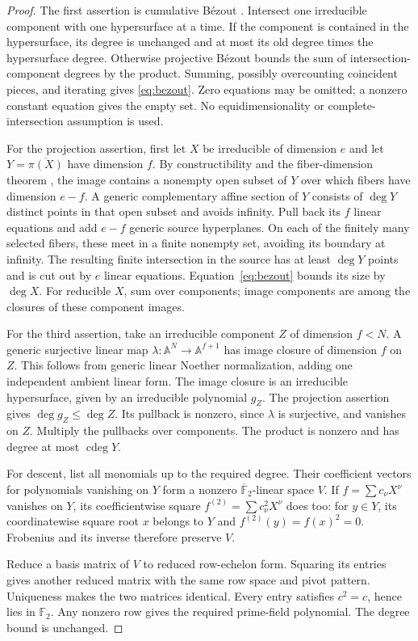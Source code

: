 \documentclass[11pt,a4paper]{article}
\newcommand{\F}{\mathbb F}
\newcommand{\A}{\mathbb A}
\DeclareMathOperator{\cdeg}{cdeg}
\theoremstyle{definition}
\theoremstyle{remark}
\numberwithin{equation}{section}
\begin{document}
\begin{proof}
The first assertion is cumulative B\'ezout \cite[Theorem 1.1]{LR}. Intersect one irreducible component with one hypersurface at a time. If the component is contained in the hypersurface, its degree is unchanged and at most its old degree times the hypersurface degree. Otherwise projective B\'ezout bounds the sum of intersection-component degrees by the product. Summing, possibly overcounting coincident pieces, and iterating gives \eqref{eq:bezout}. Zero equations may be omitted; a nonzero constant equation gives the empty set. No equidimensionality or complete-intersection assumption is used.

For the projection assertion, first let $X$ be irreducible of dimension $e$ and let $Y=\overline{\pi(X)}$ have dimension $f$. By constructibility and the fiber-dimension theorem \cite[Chapter I]{Hartshorne}, the image contains a nonempty open subset of $Y$ over which fibers have dimension $e-f$. A generic complementary affine section of $Y$ consists of $\deg Y$ distinct points in that open subset and avoids infinity. Pull back its $f$ linear equations and add $e-f$ generic source hyperplanes. On each of the finitely many selected fibers, these meet in a finite nonempty set, avoiding its boundary at infinity. The resulting finite intersection in the source has at least $\deg Y$ points and is cut out by $e$ linear equations. Equation~\eqref{eq:bezout} bounds its size by $\deg X$. For reducible $X$, sum over components; image components are among the closures of these component images.

For the third assertion, take an irreducible component $Z$ of dimension $f<N$. A generic surjective linear map $\lambda:\A^N\to\A^{f+1}$ has image closure of dimension $f$ on $Z$. This follows from generic linear Noether normalization, adding one independent ambient linear form. The image closure is an irreducible hypersurface, given by an irreducible polynomial $g_Z$. The projection assertion gives $\deg g_Z\le\deg Z$. Its pullback is nonzero, since $\lambda$ is surjective, and vanishes on $Z$. Multiply the pullbacks over components. The product is nonzero and has degree at most $\cdeg Y$.

For descent, list all monomials up to the required degree. Their coefficient vectors for polynomials vanishing on $Y$ form a nonzero $\overline{\F}_2$-linear space $V$. If $f=\sum c_\nu X^\nu$ vanishes on $Y$, its coefficientwise square $f^{(2)}=\sum c_\nu^2X^\nu$ does too: for $y\in Y$, its coordinatewise square root $x$ belongs to $Y$ and $f^{(2)}(y)=f(x)^2=0$. Frobenius and its inverse therefore preserve $V$.

Reduce a basis matrix of $V$ to reduced row-echelon form. Squaring its entries gives another reduced matrix with the same row space and pivot pattern. Uniqueness makes the two matrices identical. Every entry satisfies $c^2=c$, hence lies in $\F_2$. Any nonzero row gives the required prime-field polynomial. The degree bound is unchanged.
\end{proof}
\end{document}
